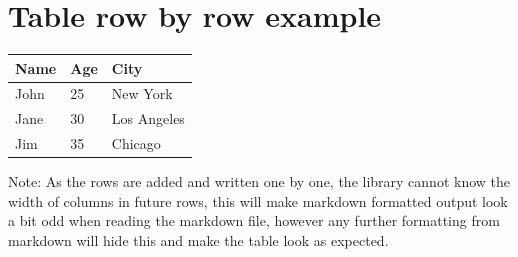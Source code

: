 \documentclass[a4paper]{report}
\begin{document}
\chapter{Table row by row example}

\noindent
\begin{tabular}{lll}
\toprule
Name & Age & City \\
\midrule
John & 25 & New York \\
Jane & 30 & Los Angeles \\
Jim & 35 & Chicago \\
\bottomrule
\end{tabular}
\par\medskip

Note: As the rows are added and written one by one, the library cannot know the width of columns in future rows, this will make markdown formatted output look a bit odd when reading the markdown file, however any further formatting from markdown will hide this and make the table look as expected.
\end{document}
